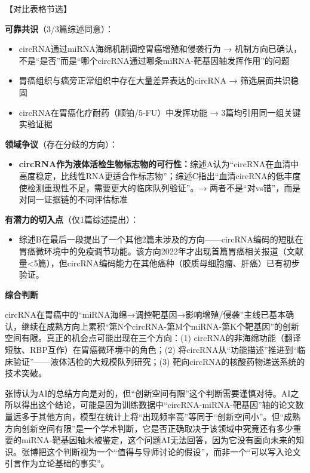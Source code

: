 \begin{aibox}
【对比表格节选】

\textbf{可靠共识}（3/3篇综述同意）：
\begin{itemize}[nosep]
\item circRNA通过miRNA海绵机制调控胃癌增殖和侵袭行为 → 机制方向已确认，不是``是否''而是``哪个circRNA通过哪条miRNA-靶基因轴发挥作用''的问题
\item 胃癌组织与癌旁正常组织中存在大量差异表达的circRNA → 筛选层面共识稳固
\item circRNA在胃癌化疗耐药（顺铂/5-FU）中发挥功能 → 3篇均引用同一组关键实验证据
\end{itemize}

\textbf{领域争议}（存在分歧的方向）：
\begin{itemize}[nosep]
\item \textbf{circRNA作为液体活检生物标志物的可行性：}综述A认为``circRNA在血清中高度稳定，比线性RNA更适合作标志物''；综述C指出``血清circRNA的低丰度使检测重现性不足，需要更大的临床队列验证''。→ 两者不是``对vs错''，而是对同一证据链的不同评估标准
\end{itemize}

\textbf{有潜力的切入点}（仅1篇综述提出）：
\begin{itemize}[nosep]
\item 综述B在最后一段提出了一个其他2篇未涉及的方向——circRNA编码的短肽在胃癌微环境中的免疫调节功能。该方向2022年才出现首篇胃癌相关报道（文献量<5篇），但circRNA编码能力在其他癌种（胶质母细胞瘤、肝癌）已有初步验证。
\end{itemize}

\medskip
\textbf{综合判断}

circRNA在胃癌中的``miRNA海绵→调控靶基因→影响增殖/侵袭''主线已基本确认，继续在成熟方向上累积``第N个circRNA-第M个miRNA-第K个靶基因''的创新空间有限。真正的机会点可能出现在三个方向：(1) circRNA的非海绵功能（翻译短肽、RBP互作）在胃癌微环境中的角色；(2) 将circRNA从``功能描述''推进到``临床验证''——液体活检的大规模队列研究；(3) 靶向circRNA的核酸药物递送系统的技术突破。
\end{aibox}

\begin{critiquebox}
张博认为AI的总结方向是对的，但``创新空间有限''这个判断需要谨慎对待。AI之所以得出这个结论，可能是因为训练数据中``circRNA-miRNA-靶基因''轴的论文数量远多于其他方向，模型在统计上将``出现频率高''等同于``创新空间小''。但``成熟方向创新空间有限''是一个学术判断，它是否正确取决于该领域中究竟还有多少重要的miRNA-靶基因轴未被鉴定，这个问题AI无法回答，因为它没有面向未来的知识。张博把这个判断视为一个``值得与导师讨论的假设''，而非一个``可以写入论文引言作为立论基础的事实''。
\end{critiquebox}

